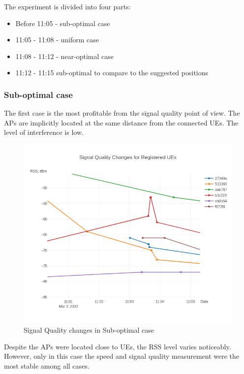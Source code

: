 The experiment is divided into four parts:

\begin{itemize}
\tightlist
\item
  Before 11:05 - sub-optimal case
\item
  11:05 - 11:08 - uniform case
\item
  11:08 - 11:12 - near-optimal case
\item
  11:12 - 11:15 sub-optimal to compare to the suggested positions
\end{itemize}

\subsubsection{Sub-optimal case}

The first case is the most profitable from the signal quality point of
view. The APs are implicitly located at the same distance from the
connected UEs. The level of interference is low.

\begin{figure}[H]
	\centering
	\includegraphics[width=\linewidth,keepaspectratio]{images/Exp4_Suboptimal.png}
\caption{Signal Quality changes in Sub-optimal case}
\end{figure}

Despite the APs were located close to UEs, the RSS level varies noticeably. However, only in this case the speed and signal quality measurement were the most stable among all cases.

